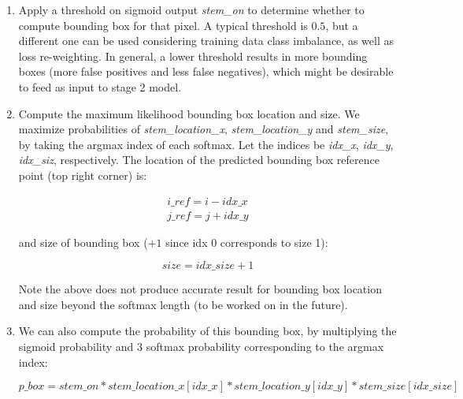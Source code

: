 \documentclass[12pt]{article}
\begin{document}
\begin{enumerate}
    \item Apply a threshold on sigmoid output \textit{stem\_on} to determine whether to compute bounding box for that pixel.
    A typical threshold is $0.5$, but a different one can be used considering training data class imbalance,
    as well as loss re-weighting.
    In general, a lower threshold results in more bounding boxes (more false positives and less false negatives),
    which might be desirable to feed as input to stage 2 model.
    \item Compute the maximum likelihood bounding box location and size.
    We maximize probabilities of \textit{stem\_location\_x}, \textit{stem\_location\_y} and \textit{stem\_size},
    by taking the argmax index of each softmax.
    Let the indices be \textit{idx\_x}, \textit{idx\_y}, \textit{idx\_siz}, respectively.
    The location of the predicted bounding box reference point (top right corner) is:

    \begin{equation}
        \begin{align}
            i\_ref = i - idx\_x \\
            j\_ref = j + idx\_y
        \end{align}
    \end{equation}

    and size of bounding box ($+1$ since idx 0 corresponds to size 1):

    \begin{equation}
        size = idx\_size + 1
    \end{equation}

    Note the above does not produce accurate result for bounding box location and size beyond the softmax length (to be worked on in the future).

    \item We can also compute the probability of this bounding box,
    by multiplying the sigmoid probability and 3 softmax probability corresponding to the argmax index:

    \begin{equation}
        p\_box = stem\_on * stem\_location\_x[idx\_x] * stem\_location\_y[idx\_y] * stem\_size[idx\_size]
    \end{equation}

\end{enumerate}
\end{document}
